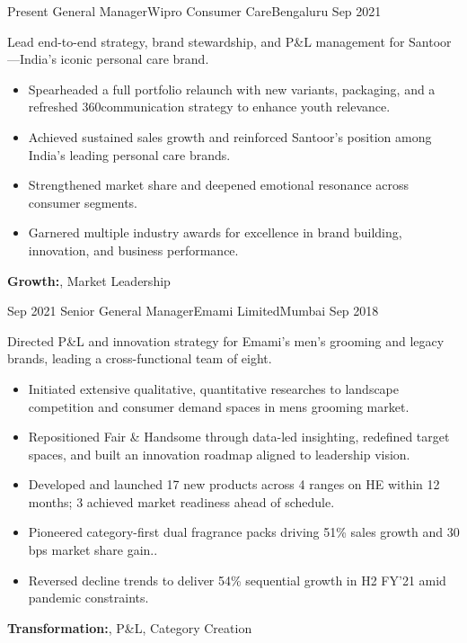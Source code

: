 \begin{experiences}

  \experience
    {Present}   {General Manager}{Wipro Consumer Care}{Bengaluru}
    {Sep 2021} {
Lead end-to-end strategy, brand stewardship, and P\&L management for Santoor—India’s iconic personal care brand.
                      \begin{itemize}
        \item {Spearheaded a full portfolio relaunch with new variants, packaging, and a refreshed 360\textdegree communication strategy to enhance youth relevance.}
        \item {Achieved sustained sales growth and reinforced Santoor’s position among India’s leading personal care brands.}
        \item {Strengthened market share and deepened emotional resonance across consumer segments.}
        \item {Garnered multiple industry awards for excellence in brand building, innovation, and business performance.}
                      \end{itemize}
                  }
        {\textbf{Growth:}, Market Leadership} 
  \emptySeparator

  \experience
    {Sep 2021}   {Senior General Manager}{Emami Limited}{Mumbai}
    {Sep 2018} {
Directed P\&L and innovation strategy for Emami’s men’s grooming and legacy brands, leading a cross-functional team of eight.
                      \begin{itemize}
        \item {Initiated extensive qualitative, quantitative researches to landscape competition and consumer demand spaces in mens grooming market.}
        \item {Repositioned Fair \& Handsome through data-led insighting, redefined target spaces, and built an innovation roadmap aligned to leadership vision.}
        \item {Developed and launched 17 new products across 4 ranges on HE within 12 months; 3 achieved market readiness ahead of schedule.}
        \item {Pioneered category-first dual fragrance packs driving 51\% sales growth and 30 bps market share gain..}
        \item {Reversed decline trends to deliver 54\% sequential growth in H2 FY’21 amid pandemic constraints.}
                      \end{itemize}
                  }
        {\textbf{Transformation:}, P\&L, Category Creation} 
  \emptySeparator


\end{experiences}
